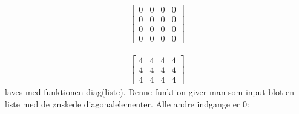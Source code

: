 \documentclass[letterpaper,10pt,english]{jupyterBook}
\begin{document}
\begin{sphinxVerbatim}[commandchars=\\\{\}]
    

  
\end{sphinxVerbatim}
\begin{equation*}
\begin{split}\displaystyle \left[\begin{matrix}0 & 0 & 0 & 0\\0 & 0 & 0 & 0\\0 & 0 & 0 & 0\\0 & 0 & 0 & 0\end{matrix}\right]\end{split}
\end{equation*}
\begin{sphinxVerbatim}[commandchars=\\\{\}]
     
\end{sphinxVerbatim}
\begin{equation*}
\begin{split}\displaystyle \left[\begin{matrix}4 & 4 & 4 & 4\\4 & 4 & 4 & 4\\4 & 4 & 4 & 4\end{matrix}\right]\end{split}
\end{equation*}
 laves med funktionen diag(liste). Denne funktion giver man som input blot en liste med de ønskede diagonalelementer. Alle andre indgange er \(0\):
\end{document}
